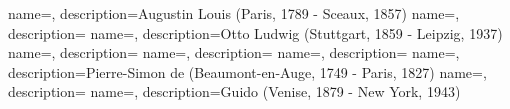  {
    name=,
    description={Augustin Louis (Paris, 1789 - Sceaux, 1857)}
}
 {
    name=,
    description={}
}
 {
    name=,
    description={Otto Ludwig (Stuttgart, 1859 - Leipzig, 1937)}
}
 {
    name=,
    description={}
}
 {
    name=,
    description={}
}
 {
    name=,
    description={}
}
 {
    name=,
    description={Pierre-Simon de (Beaumont-en-Auge, 1749 - Paris, 1827)}
}
 {
    name=,
    description={}
}
 {
    name=,
    description={Guido (Venise, 1879 - New York, 1943)}
}
